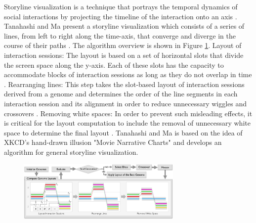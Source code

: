 \documentclass{egpubl}
\begin{document}
Storyline visualization is a technique that portrays the temporal dynamics of social interactions by projecting the timeline of the interaction onto an axis \cite{Tanahashi}.
Tanahashi and Ma present a storyline visualization which consists of a series of lines, from left to
right along the time-axis, that converge and diverge in the course of their paths \cite{Tanahashi}.
The algorithm overview is shown in Figure \ref{fig:Tanahashi2012}.
Layout of interaction sessions: The layout is based on a set of horizontal slots that divide the screen space along the y-axis. Each of these slots has the capacity to accommodate blocks of interaction sessions as long as they do not overlap in time \cite{Tanahashi}.
Rearranging lines: This step takes the slot-based layout of interaction sessions derived from a genome and determines the order of the line segments in each interaction session and its alignment in order to reduce unnecessary wiggles and crossovers \cite{Tanahashi}.
Removing white spaces: In order to prevent such misleading effects, it is critical for the layout computation to include the removal of unnecessary white space to determine the final layout \cite{Tanahashi}.
Tanahashi and Ma \cite{Tanahashi} is based on the idea of XKCD's hand-drawn illusion "Movie Narrative Charts" \cite{Ogievetsky2009} and develops an algorithm for general storyline visualization.
\begin{figure}
\begingroup
\centering
\includegraphics[width=8cm]{./images/Tanahashi2012}
\label{fig:Tanahashi2012}
\endgroup
\end{figure}
\end{document}
